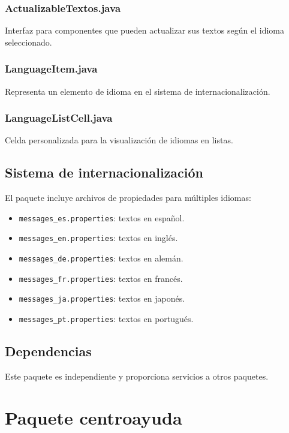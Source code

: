 \subsubsection{ActualizableTextos.java}

Interfaz para componentes que pueden actualizar sus textos según el idioma seleccionado.

\subsubsection{LanguageItem.java}

Representa un elemento de idioma en el sistema de internacionalización.

\subsubsection{LanguageListCell.java}

Celda personalizada para la visualización de idiomas en listas.

\subsection{Sistema de internacionalización}

El paquete incluye archivos de propiedades para múltiples idiomas:

\begin{itemize}
    \item \verb|messages_es.properties|: textos en español.
    \item \verb|messages_en.properties|: textos en inglés.
    \item \verb|messages_de.properties|: textos en alemán.
    \item \verb|messages_fr.properties|: textos en francés.
    \item \verb|messages_ja.properties|: textos en japonés.
    \item \verb|messages_pt.properties|: textos en portugués.
\end{itemize}

\subsection{Dependencias}

Este paquete es independiente y proporciona servicios a otros paquetes.

\section{Paquete centroayuda}

